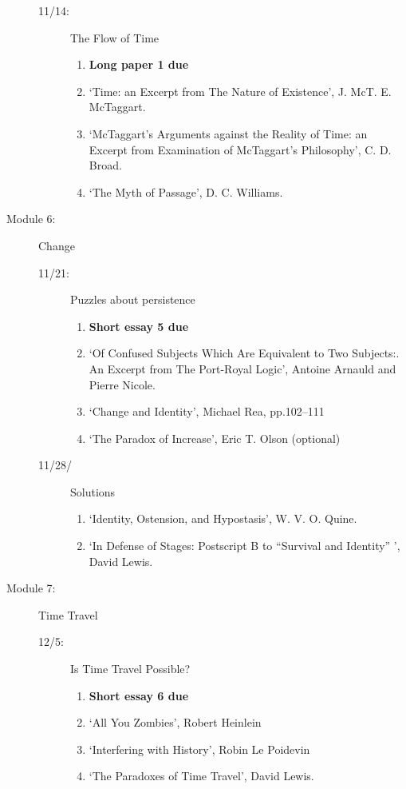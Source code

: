 \documentclass[article,oneside]{memoir}
\begin{document}
\begin{description}
\begin{description}
\item[11/14:] The Flow of Time
\begin{enumerate}
\item \textbf{Long paper 1 due}
\item `Time: an Excerpt from The Nature of Existence', J. McT. E. McTaggart.
\item `McTaggart’s Arguments against the Reality of Time: an Excerpt from Examination of McTaggart’s Philosophy', C. D. Broad.
\item `The Myth of Passage', D. C. Williams.
\end{enumerate}
\end{description}

\item[Module 6:] Change
\begin{description}
\item[11/21:] Puzzles about persistence
\begin{enumerate}
\item \textbf{Short essay 5 due}
\item `Of Confused Subjects Which Are Equivalent to Two Subjects:. An Excerpt from The Port-Royal Logic', Antoine Arnauld and Pierre Nicole. 
\item `Change and Identity', Michael Rea, pp.102--111 
\item `The Paradox of Increase', Eric T. Olson (optional)
\end{enumerate}
\item[11/28/] Solutions
\begin{enumerate}
 \item `Identity, Ostension, and Hypostasis', W. V. O. Quine.
\item `In Defense of Stages: Postscript B to ``Survival and Identity'' ', David Lewis.
\end{enumerate}
\end{description}

\item[Module 7:] Time Travel
\begin{description}
\item[12/5:] Is Time Travel Possible?
\begin{enumerate}
\item \textbf{Short essay 6 due}
\item `All You Zombies', Robert Heinlein 
\item `Interfering with History', Robin Le Poidevin 
\item `The Paradoxes of Time Travel', David Lewis.


\end{enumerate}
\end{description}
\end{description}
\end{document}
